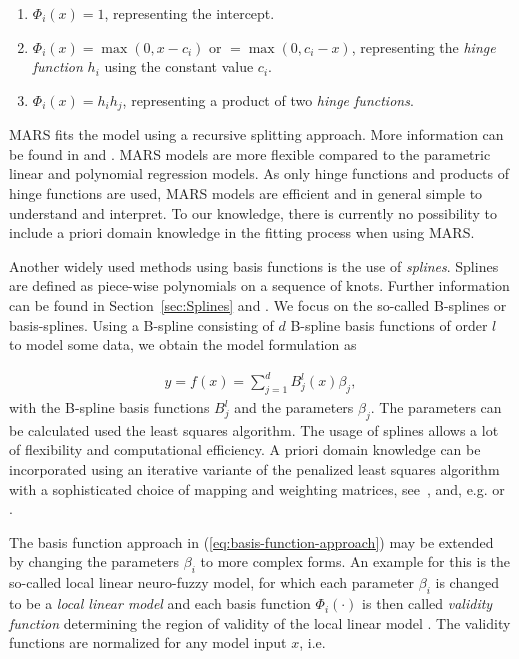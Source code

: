 \begin{enumerate}
	\item $\Phi_i(x) = 1$, representing the intercept.
	\item $\Phi_i(x) = \max(0, x - c_i)$ or $= \max(0, c_i - x)$, representing the \emph{hinge function} $h_i$ using the constant value $c_i$.
	\item $\Phi_i(x) = h_i  h_j$, representing a product of two \emph{hinge functions}.
\end{enumerate}
%
MARS fits the model using a recursive splitting approach. More information can be found in \cite{friedman2001elements} and \cite{friedman1991multivariate}. MARS models are more flexible compared to the parametric linear and polynomial regression models. As only hinge functions and products of hinge functions are used, MARS models are efficient and in general simple to understand and interpret. To our knowledge, there is currently no possibility to include a priori domain knowledge in the fitting process when using MARS. 

Another widely used methods using basis functions is the use of \emph{splines}. Splines are defined as piece-wise polynomials on a sequence of knots. Further information can be found in Section~\ref{sec:Splines} and \cite{deBoor1978practicalGuideToSplines}. We focus on the so-called B-splines or basis-splines. Using a B-spline consisting of $d$ B-spline basis functions of order $l$ to model some data, we obtain the model formulation as

\begin{align} \label{eq:Spline-basis-formulation}
	y = f(x) = \sum_{j=1}^d B_j^l(x) \beta_j, 
\end{align}
%
with the B-spline basis functions $B_j^l$ and the parameters $\beta_j$. The parameters can be calculated used the least squares algorithm. The usage of splines allows a lot of flexibility and computational efficiency. A priori domain knowledge can be incorporated using an iterative variante of the penalized least squares algorithm with a sophisticated choice of mapping and weighting matrices, see~, and, e.g. \cite{hofner2011monotonicity} or \cite{bollaerts2006simple}.

The basis function approach in (\ref{eq:basis-function-approach}) may be extended by changing the parameters $\beta_i$ to more complex forms. An example for this is the so-called local linear neuro-fuzzy model, for which each parameter $\beta_i$ is changed to be a \emph{local linear model} and each basis function $\Phi_i(\cdot)$ is then called \emph{validity function} determining the region of validity of the local linear model \cite{nelles2013nonlinear}. The validity functions are normalized for any model input $x$, i.e.

